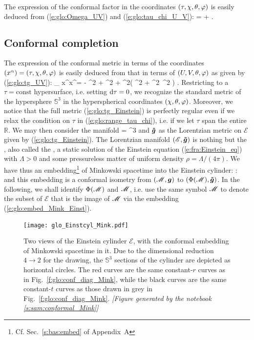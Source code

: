 The expression of the conformal factor in the
coordinates $(\tau,\chi,\theta,\varphi)$ is easily deduced from
(\ref{e:glo:Omega_UV}) and
(\ref{e:glo:tau_chi_U_V}):
\be \label{e:glo:Omega_tau_chi}
    \Omega = \cos\tau + \cos\chi .
\ee


\subsection{Conformal completion} \label{s:glo:conf_complet_Mink}

The expression of the conformal metric in terms of the coordinates
$(x^\alpha) = (\tau,\chi,\theta,\varphi)$ is easily deduced from that in terms of
$(U,V,\theta,\varphi)$ as given by (\ref{e:glo:tg_UV}):
\be \label{e:glo:tg_Einstein}
    _{\mu\nu} \D x^\mu \D x^\nu =  - \D\tau^2
        + \D \chi^2
        + \sin^2\chi \left(  \D\th^2 + \sin^2\th \, \D\ph^2 \right) .
\ee
Restricting to a $\tau = \mathrm{const}$ hypersurface, i.e. setting $\mathrm{d}\tau=0$,
we recognize the standard metric of the hypersphere
$\mathbb{S}^3$ in the hyperspherical coordinates $(\chi,\theta,\varphi)$.
Moreover, we notice that the full metric (\ref{e:glo:tg_Einstein})
is perfectly regular even if we relax
the condition on $\tau$ in (\ref{e:glo:range_tau_chi}), i.e. if we
let $\tau$ span the
entire $\mathbb{R}$. We may then consider the manifold
\be
     = \times {}^3
\ee
and $\bm{\tilde{g}}$ as the Lorentzian metric on $\mathscr{E}$ given by
(\ref{e:glo:tg_Einstein}).
The Lorentzian manifold
$(\mathscr{E},\bm{\tilde{g}})$ is nothing but the
, also called the ,
a static solution of the Einstein equation (\ref{e:fra:Einstein_eq})
with $\Lambda > 0$ and some pressureless matter of uniform density
$\rho = \Lambda/(4\pi)$.
We have thus an embedding\footnote{Cf. Sec.~\ref{s:bas:embed} of Appendix~A} of Minkowski spacetime into the Einstein cylinder:
\be \label{e:glo:embed_Mink_Einst}
     \Phi:\ \M \longrightarrow {}
\ee
and this embedding is a conformal isometry from
$(\mathscr{M},\bm{g})$ to $(\Phi(\mathscr{M}),\bm{\tilde{g}})$.
In the following, we shall identify $\Phi(\mathscr{M})$ and $\mathscr{M}$, i.e. use the same
symbol $\mathscr{M}$ to denote the subset of $\mathscr{E}$ that is the image of $\mathscr{M}$ via the
embedding (\ref{e:glo:embed_Mink_Einst}).

\begin{figure}
\centerline{\texttt{[image: glo\_Einstcyl\_Mink.pdf]}}
\caption[]{\label{f:glo:Einstcyl_Mink}\footnotesize
Two views of the Einstein cylinder $\mathscr{E}$, with the conformal embedding of
Minkowski spacetime in it. Due to the dimensional reduction $4 \to 2$ for
the drawing, the
$\mathbb{S}^3$ sections of the cylinder are depicted as horizontal circles.
The red curves are the same constant-$r$ curves
as in Fig.~\ref{f:glo:conf_diag_Mink}, while the black curves are
the same constant-$t$ curves as those drawn in grey in Fig.~\ref{f:glo:conf_diag_Mink}.
\textsl{[Figure generated by the notebook \ref{s:sam:conformal_Mink}]}
}
\end{figure}

